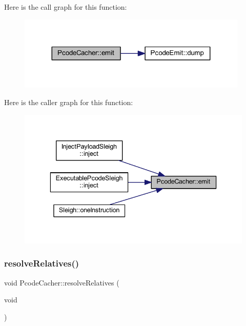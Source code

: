 Here is the call graph for this function\+:
\nopagebreak
\begin{figure}[H]
\begin{center}
\leavevmode
\includegraphics[width=311pt]{class_pcode_cacher_a75c21a233c9eef255c53a498790882fc_cgraph}
\end{center}
\end{figure}
Here is the caller graph for this function\+:
\nopagebreak
\begin{figure}[H]
\begin{center}
\leavevmode
\includegraphics[width=336pt]{class_pcode_cacher_a75c21a233c9eef255c53a498790882fc_icgraph}
\end{center}
\end{figure}
\mbox{\label{class_pcode_cacher_a43bb71389841843cc69d3a36d46674f1}} 
\subsubsection{\texorpdfstring{resolveRelatives()}{resolveRelatives()}}
{\footnotesize\ttfamily void Pcode\+Cacher\+::resolve\+Relatives (\begin{DoxyParamCaption}\item[{void}]{ }\end{DoxyParamCaption})}



